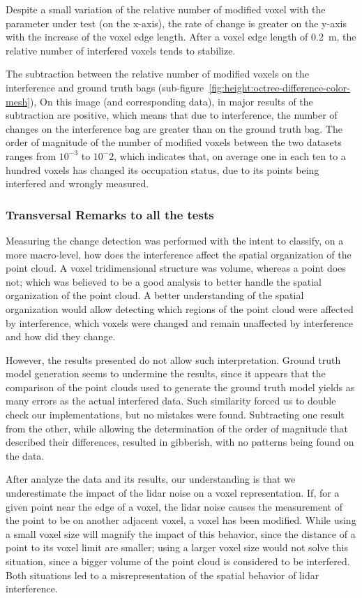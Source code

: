 Despite a small variation of the relative number of modified voxel with the parameter under test (on the x-axis), the rate of change is greater on the y-axis with the increase of the voxel edge length. After a voxel edge length of \SI{0.2}{\meter}, the relative number of interfered voxels tends to stabilize. 

The subtraction between the relative number of modified voxels on the interference and ground truth bags (sub-figure~\ref{fig:height:octree-difference-color-mesh}), On this image (and corresponding data), in major results of the subtraction are positive, which means that due to interference, the number of changes on the interference bag are greater than on the ground truth bag. The order of magnitude of the number of modified voxels between the two datasets ranges from $10^{-3}$ to $10^-2$, which indicates that, on average one in each ten to a hundred voxels has changed its occupation status, due to its points being interfered and wrongly measured.


\subsubsection{Transversal Remarks to all the tests}
Measuring the change detection was performed with the intent to classify, on a more macro-level, how does the interference affect the spatial organization of the point cloud. A voxel tridimensional structure was volume, whereas a point does not; which was believed to be a good analysis to better handle the spatial organization of the point cloud. A better understanding of the spatial organization would allow detecting which regions of the point cloud were affected by interference, which voxels were changed and remain unaffected by interference and how did they change.

However, the results presented do not allow such interpretation. Ground truth model generation seems to undermine the results, since it appears that the comparison of the point clouds used to generate the ground truth model yields as many errors as the actual interfered data. Such similarity forced us to double check our implementations, but no mistakes were found. Subtracting one result from the other, while allowing the determination of the order of magnitude that described their differences, resulted in gibberish, with no patterns being found on the data.

After analyze the data and its results, our understanding is that we underestimate the impact of the \ac{lidar} noise on a voxel representation. If, for a given point near the edge of a voxel, the \ac{lidar} noise causes the measurement of the point to be on another adjacent voxel, a voxel has been modified. While using a small voxel size will magnify the impact of this behavior, since the distance of a point to its voxel limit are smaller; using a larger voxel size would not solve this situation, since a bigger volume of the point cloud is considered to be interfered. Both situations led to a misrepresentation of the spatial behavior of \ac{lidar} interference. 

